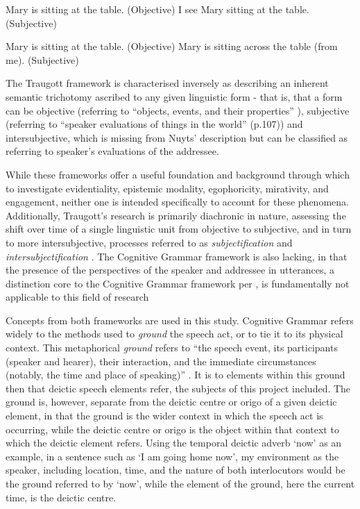 \begin{exe}
\ex\label{ex:LangackerNuyts1}
\begin{xlist}
\ex Mary is sitting at the table. (Objective)\label{ex:LangackerNuyts1:Obj}
\ex I see Mary sitting at the table. (Subjective)\label{ex:LangackerNuyts1:Subj}
\end{xlist}
\cite[107]{Nuyts2015}
\end{exe}

\begin{exe}
\ex\label{ex:MyLangackerNuyts}
\begin{xlist}
\ex Mary is sitting at the table. (Objective)
\ex Mary is sitting across the table (from me). (Subjective)
\end{xlist}
\end{exe}

The Traugott framework is characterised inversely as describing an inherent semantic trichotomy ascribed to any given linguistic form - that is, that a form can be objective (referring to ``objects, events, and their properties'' \cite[107]{Nuyts2015}), subjective (referring to ``speaker evaluations of things in the world'' (p.107)) and intersubjective, which is missing from Nuyts' description but can be classified as referring to speaker's evaluations of the addressee.

While these frameworks offer a useful foundation and background through which to investigate evidentiality, epistemic modality, egophoricity, mirativity, and engagement, neither one is intended specifically to account for these phenomena. Additionally, Traugott's research is primarily diachronic in nature, assessing the shift over time of a single linguistic unit from objective to subjective, and in turn to more intersubjective, processes referred to as \textit{subjectification} and \textit{intersubjectification} \cites{Traugott1995}{Traugott2014}. The Cognitive Grammar framework is also lacking, in that the presence of the perspectives of the speaker and addressee in utterances, a distinction core to the Cognitive Grammar framework per , is fundamentally not applicable to this field of research 

Concepts from both frameworks are used in this study. Cognitive Grammar refers widely to the methods used to \textit{ground} the speech act, or to tie it to its physical context. This metaphorical \textit{ground} refers to ``the speech event, its participants (speaker and hearer), their interaction, and the immediate circumstances (notably, the time and place of speaking)'' \cite[259]{Langacker2008}. It is to elements within this ground then that deictic speech elements refer, the subjects of this project included. The ground is, however, separate from the deictic centre or origo of a given deictic element, in that the ground is the wider context in which the speech act is occurring, while the deictic centre or origo is the object within that context to which the deictic element refers. Using the temporal deictic adverb `now' as an example, in a sentence such as `I am going home now', my environment as the speaker, including location, time, and the nature of both interlocutors would be the ground referred to by `now', while the element of the ground, here the current time, is the deictic centre.

